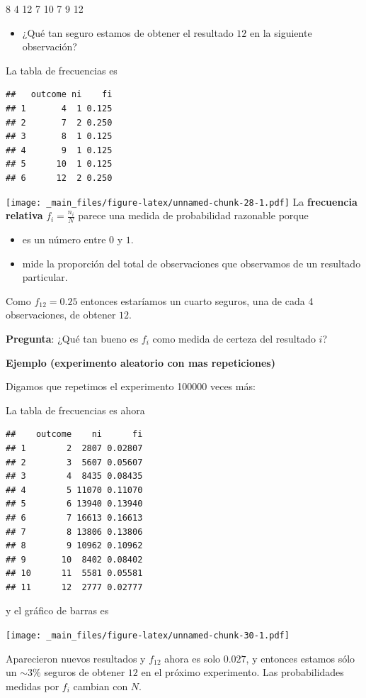 \documentclass[
]{book}
\providecommand{\tightlist}{%
  \setlength{\itemsep}{0pt}\setlength{\parskip}{0pt}}
\begin{document}
8 4 12 7 10 7 9 12

\begin{itemize}
\tightlist
\item
  ¿Qué tan seguro estamos de obtener el resultado \(12\) en la siguiente observación?
\end{itemize}

La tabla de frecuencias es

\begin{verbatim}
##   outcome ni    fi
## 1       4  1 0.125
## 2       7  2 0.250
## 3       8  1 0.125
## 4       9  1 0.125
## 5      10  1 0.125
## 6      12  2 0.250
\end{verbatim}

\texttt{[image: \_main\_files/figure-latex/unnamed-chunk-28-1.pdf]}
La \textbf{frecuencia relativa} \(f_i=\frac{n_i}{N}\) parece una medida de probabilidad razonable porque

\begin{itemize}
\tightlist
\item
  es un número entre \(0\) y \(1\).
\item
  mide la proporción del total de observaciones que observamos de un resultado particular.
\end{itemize}

Como \(f_{12}=0.25\) entonces estaríamos un cuarto seguros, una de cada 4 observaciones, de obtener \(12\).

\textbf{Pregunta}: ¿Qué tan bueno es \(f_i\) como medida de certeza del resultado \(i\)?

\textbf{Ejemplo (experimento aleatorio con mas repeticiones)}

Digamos que repetimos el experimento 100000 veces más:

La tabla de frecuencias es ahora

\begin{verbatim}
##    outcome    ni      fi
## 1        2  2807 0.02807
## 2        3  5607 0.05607
## 3        4  8435 0.08435
## 4        5 11070 0.11070
## 5        6 13940 0.13940
## 6        7 16613 0.16613
## 7        8 13806 0.13806
## 8        9 10962 0.10962
## 9       10  8402 0.08402
## 10      11  5581 0.05581
## 11      12  2777 0.02777
\end{verbatim}

y el gráfico de barras es

\texttt{[image: \_main\_files/figure-latex/unnamed-chunk-30-1.pdf]}

Aparecieron nuevos resultados y \(f_{12}\) ahora es solo \(0.027\), y entonces estamos sólo un \(\sim 3\%\) seguros de obtener \(12\) en el próximo experimento. Las probabilidades medidas por \(f_i\) cambian con \(N\).
\end{document}
